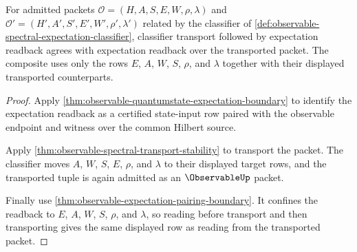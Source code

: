 \begin{theorem}
\label{thm:observable-expectation-row-transport-composition}
For admitted packets
$\mathcal{O}=(H,A,S,E,W,\rho,\lambda)$ and
$\mathcal{O}'=(H',A',S',E',W',\rho',\lambda')$ related by the classifier of
\autoref{def:observable-spectral-expectation-classifier}, classifier transport
followed by expectation readback agrees with expectation readback over the
transported packet. The composite uses only the rows $E$, $A$, $W$, $S$,
$\rho$, and $\lambda$ together with their displayed transported counterparts.
\end{theorem}
\begin{proof}
Apply \autoref{thm:observable-quantumstate-expectation-boundary} to identify
the expectation readback as a certified state-input row paired with the
observable endpoint and witness over the common Hilbert source.

Apply \autoref{thm:observable-spectral-transport-stability} to transport the
packet. The classifier moves $A$, $W$, $S$, $E$, $\rho$, and $\lambda$ to their
displayed target rows, and the transported tuple is again admitted as an
$\ObservableUp$ packet.

Finally use \autoref{thm:observable-expectation-pairing-boundary}. It confines
the readback to $E$, $A$, $W$, $S$, $\rho$, and $\lambda$, so reading before
transport and then transporting gives the same displayed row as reading from
the transported packet.
\end{proof}

